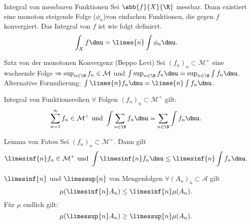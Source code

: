\begin{karte}{Integral von messbaren Funktionen}
	Sei \( \abb{f}{X}{\R} \) messbar. Dann existiert eine monoton steigende 
	Folge (\( \phi_n\))von einfachen Funktionen, die gegen \(f\) konvergiert.
	Das Integral von \(f\) ist wie folgt definiert.
	\[ \int_X f \dmu = \limes{n} \int \phi_n \dmu. \]
\end{karte}

\begin{karte}{Satz von der monotonen Konvergenz (Beppo Levi)}
	Sei \( (f_n)_n \subset \mathcal{M}^+ \) eine wachsende Folge
	\( \Rightarrow \sup_{n\in\N} f_n \in \mathcal{M} \) und 
	\( \int \sup_{n\in\N} f_n \dmu 
	= \sup_{n\in\N} \int f_n \dmu \).\\
	Alternative Formulierung: 
	\( \int \limes{n} f_n \dmu 
	= \limes{n} \int f_n \dmu \).
\end{karte}

\begin{karte}{Integral von Funktionsreihen}
	\( \forall \) Folgen \( (f_n)_n \subset \mathcal{M}^+ \) gilt: 
	\[ \sum_{n=1}^{\infty} f_n \in \mathcal{M}^+ \text{ und } \int \sum_{n\in\N} f_n \dmu 
	= \sum_{n\in\N} \int f_n \dmu. \]
\end{karte}

\begin{karte}{Lemma von Fatou}
	Sei \( (f_n)_n \subset \mathcal{M}^+ \). Dann gilt 
	\[ \limesinf{n} f_n \in \mathcal{M}^+ 
	\text{ und } \int \limesinf{n} f_n \dmu \leq \limesinf{n} \int f_n \dmu. \]
\end{karte}

\begin{karte}{\(\limesinf{n}\) und \( \limessup{n} \) von Mengenfolgen}
	\( \forall (A_n)_n \subset \mathcal{A} \) gilt 
	\[ \mu(\limesinf{n} A_n) \leq \limesinf{n} \mu(A_n). \]
	Für \( \mu \) endlich gilt: 
	\[ \mu(\limessup{n} A_n) \geq \limessup{n} \mu(A_n). \]
\end{karte}